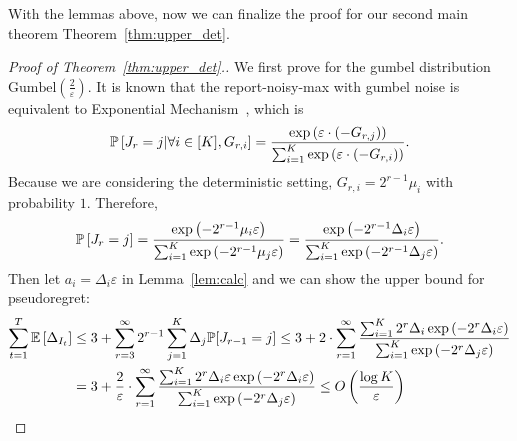 With the lemmas above, now we can finalize the proof for our second main theorem Theorem~\ref{thm:upper_det}.
\begin{proof}[Proof of Theorem~\ref{thm:upper_det}.]
	We first prove for the gumbel distribution $\mathrm{Gumbel}(\frac{2}{\varepsilon})$. 
	It is known that the report-noisy-max with gumbel noise is equivalent to Exponential Mechanism~\citep{mcsherry2007mechanism,qiao2021oneshot}, which is
$$\mathbb{P}\left[J_r = j|\forall i\in [K], G_{r, i} \right] = \frac{\exp\left( \varepsilon\cdot (-G_{r, j} ) \right)}{\sum_{i=1}^K\exp\left( \varepsilon\cdot (-G_{r, i}) \right)}.$$
Because we are considering the deterministic setting, $G_{r, i}=2^{r-1}\mu_i$ with probability $1$.
Therefore,
$$\mathbb{P}\left[J_r = j \right] = \frac{\exp\left( -2^{r-1}\mu_i\varepsilon \right)}{\sum_{i=1}^K\exp\left( -2^{r-1}\mu_j\varepsilon\right)} = \frac{\exp\left( -2^{r-1}\Delta_i\varepsilon \right)}{\sum_{i=1}^K\exp\left( -2^{r-1}\Delta_j\varepsilon\right)}.$$
Then let $a_i = \Delta_i\varepsilon$ in Lemma~\ref{lem:calc} and we can show the upper bound for pseudoregret:
\begin{align*}
\sum_{t=1}^T \mathbb{E}\left[\Delta_{I_t}\right] &\leq 3 + \sum_{r=3}^{\infty} 2^{r-1}\sum_{j=1}^{K}\Delta_{j}\mathbb{P}[J_{r-1} = j] \leq 3 + 2\cdot \sum_{r=1}^{\infty} \frac{\sum_{i=1}^{K}2^{r}\Delta_{i}\exp\left( -2^{r}\Delta_i\varepsilon \right)}{\sum_{i=1}^K\exp\left( -2^{r}\Delta_j\varepsilon\right)} \\
& =3 + \frac{2}{\varepsilon}\cdot \sum_{r=1}^{\infty} \frac{\sum_{i=1}^{K}2^{r}\Delta_{i}\varepsilon\exp\left( -2^{r}\Delta_i\varepsilon \right)}{\sum_{i=1}^K\exp\left( -2^{r}\Delta_j\varepsilon\right)} \leq O\left(\frac{\log K}{\varepsilon}\right)
\end{align*}


\end{proof}
